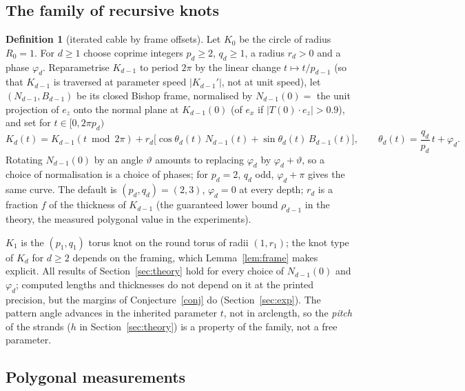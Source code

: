 \documentclass[10pt,a4paper]{article}
\theoremstyle{plain}
\theoremstyle{definition}
\newtheorem{definition}[theorem]{Definition}
\theoremstyle{remark}
\begin{document}
\subsection{The family of recursive knots}\label{sec:family}

\begin{definition}[iterated cable by frame offsets]\label{def:family}
Let $K_0$ be the circle of radius $R_0=1$. For $d\ge1$ choose coprime integers $p_d\ge2$, $q_d\ge1$, a radius $r_d>0$ and a phase $\varphi_d$. Reparametrise $K_{d-1}$ to period $2\pi$ by the linear change $t\mapsto t/p_{d-1}$ (so that $K_{d-1}$ is traversed at parameter speed $|K_{d-1}'|$, not at unit speed), let $(N_{d-1},B_{d-1})$ be its closed Bishop frame, normalised by $N_{d-1}(0)=$ the unit projection of $e_z$ onto the normal plane at $K_{d-1}(0)$ (of $e_x$ if $|T(0)\cdot e_z|>0.9$), and set for $t\in[0,2\pi p_d)$
\begin{equation}\label{eq:Kd}
K_d(t)=K_{d-1}(t\bmod 2\pi)+r_d\bigl[\cos\theta_d(t)\,N_{d-1}(t)+\sin\theta_d(t)\,B_{d-1}(t)\bigr],\qquad \theta_d(t)=\frac{q_d}{p_d}\,t+\varphi_d .
\end{equation}
Rotating $N_{d-1}(0)$ by an angle $\vartheta$ amounts to replacing $\varphi_d$ by $\varphi_d+\vartheta$, so a choice of normalisation is a choice of phases; for $p_d=2$, $q_d$ odd, $\varphi_d+\pi$ gives the same curve. The default is $(p_d,q_d)=(2,3)$, $\varphi_d=0$ at every depth; $r_d$ is a fraction $f$ of the thickness of $K_{d-1}$ (the guaranteed lower bound $\rho_{d-1}$ in the theory, the measured polygonal value in the experiments).
\end{definition}

$K_1$ is the $(p_1,q_1)$ torus knot on the round torus of radii $(1,r_1)$; the knot type of $K_d$ for $d\ge2$ depends on the framing, which Lemma~\ref{lem:frame} makes explicit. All results of Section~\ref{sec:theory} hold for every choice of $N_{d-1}(0)$ and $\varphi_d$; computed lengths and thicknesses do not depend on it at the printed precision, but the margins of Conjecture~\ref{conj} do (Section~\ref{sec:exp}). The pattern angle advances in the inherited parameter $t$, not in arclength, so the \emph{pitch} of the strands ($h$ in Section~\ref{sec:theory}) is a property of the family, not a free parameter.

\subsection{Polygonal measurements}\label{sec:poly}
\end{document}
